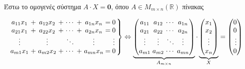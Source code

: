 \begin{examples}
\begin{enumerate}
            Έστω το ομογενές σύστημα $ A\cdot X = \mathbf{0} $, όπου 
            $ A \in M_{m \times n}( \mathbb{R}) $ πίνακας

            \begin{equation*}
                \setlength\arraycolsep{1.5pt} %
                \left.
                    \begin{array}{ccc ccc c @{\extracolsep{2.5pt}}c
                        @{\extracolsep{2.5pt}}c}
                        a_{11}x_{1} & + & a_{12}x_{2} & + & \cdots & + & a_{1n}x_{n} & =
                                    & 0 \\
                        a_{21}x_{1} & + & a_{22}x_{2} & + & \cdots & + & a_{2n}x_{n} & =
                                    & 0 \\
                        \vdots & & \vdots & & \ddots & &  \vdots & &  \vdots \\
                        a_{m1}x_{1} & + & a_{m2}x_{2} & + & \cdots & + & a_{mn}x_{n} & =
                                    & 0 \\
                    \end{array}
                \right\} \Leftrightarrow 
                \underbrace{\begin{pmatrix}
                        a_{11} & a_{12} & \cdots & a_{1n} \\
                        a_{21} & a_{22} & \cdots & a_{2n} \\
                        \vdots & \vdots & \ddots & \vdots \\
                        a_{m1} & a_{m2} & \cdots & a_{mn} 
                \end{pmatrix}}_{A_{m \times n}}
                \cdot 
                \underbrace{\begin{pmatrix*}
                        x_{1} \\
                        x_{2} \\
                        \vdots \\
                        x_{n}
                \end{pmatrix*}}_{X} = 
                \begin{pmatrix*}[r]
                    0 \\
                    0 \\
                    \vdots \\
                    0
                \end{pmatrix*}

\end{equation*}
\end{enumerate}
\end{examples}
